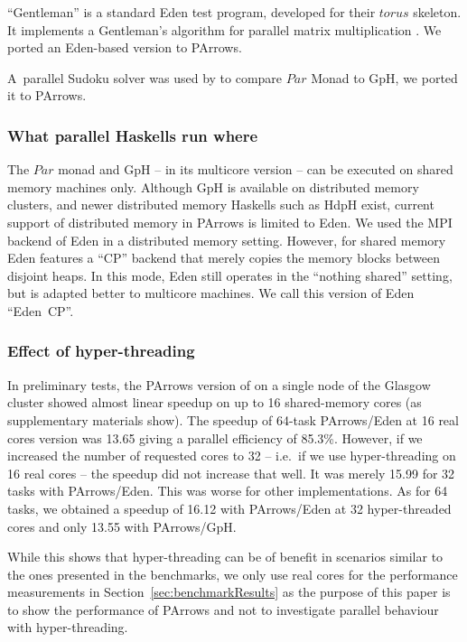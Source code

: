 \documentclass{jfp1}
\newcommand{\Conid}[1]{\mathit{#1}}
\newcommand{\Varid}[1]{\mathit{#1}}
\renewcommand{\cite}[1]{\citep{#1}}
\DeclareRobustCommand{\hairspn}{\hspace{1pt}\nolinebreak}%
\DeclareRobustCommand{\ie}{{i.\hairspn{}e.~}}
\begin{document}
\enquote{Gentleman} is a standard Eden test program, developed
for their \ensuremath{\Varid{torus}} skeleton. It implements a Gentleman's algorithm for parallel matrix
multiplication \citep{Gentleman1978}. We ported an Eden-based version \citep{Eden:SkeletonBookChapter02} to PArrows.

A~parallel Sudoku solver was used by \citet{par-monad} to compare \ensuremath{\Conid{Par}} Monad
to GpH, we ported it to PArrows.

\subsubsection{What parallel Haskells run where}

The \ensuremath{\Conid{Par}} monad and GpH -- in its multicore version \cite{Marlow2009} --  can be executed on shared memory machines only.
Although GpH is available on distributed memory
clusters, and newer distributed memory Haskells such as HdpH exist,
current support of distributed memory in PArrows is limited to
Eden. We used the MPI backend of Eden in a distributed memory
setting. However, for shared memory Eden features a \enquote{CP} backend
that merely copies the memory blocks between disjoint heaps. In
this mode, Eden still operates in the \enquote{nothing shared} setting, but
is adapted better to multicore machines. We call this version of Eden
\enquote{Eden~CP}.



\subsubsection{Effect of hyper-threading}

In preliminary tests, the PArrows version of \rmtest on a single node of the Glasgow cluster
showed almost linear speedup on up to 16 shared-memory cores (as supplementary materials show). The speedup
of 64-task PArrows/Eden at 16 real cores version was 13.65 giving a parallel
efficiency of 85.3\%. However, if we increased the number of
requested cores to 32 -- \ie if we use hyper-threading on 16 real
cores -- the speedup did not increase that well. It was merely 15.99
for 32 tasks with PArrows/Eden. This was worse for other implementations.  As
for 64 tasks, we obtained a speedup of 16.12 with PArrows/Eden at 32
hyper-threaded cores and only 13.55 with PArrows/GpH. 

While this shows that hyper-threading can be of benefit in scenarios similar to the ones presented in the benchmarks, we only use real cores for the performance measurements in Section~\ref{sec:benchmarkResults} as the purpose of this paper is to show the performance of PArrows and not to investigate parallel behaviour with hyper-threading.
\end{document}
